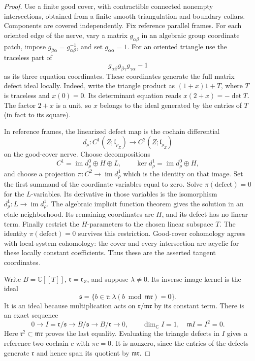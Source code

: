 \begin{proof}
Use a finite good cover, with contractible connected nonempty
intersections, obtained from a finite smooth triangulation and
boundary collars.  Components are covered independently.
Fix reference parallel frames.  For each oriented edge of the
nerve, vary a matrix \(g_{\alpha\beta}\) in an algebraic group
coordinate patch, impose
\(g_{\beta\alpha}=g_{\alpha\beta}^{-1}\), and set
\(g_{\alpha\alpha}=1\).  For an oriented triangle use the
traceless part of
\[
 g_{\alpha\beta}g_{\beta\gamma}g_{\gamma\alpha}-1
\]
as its three equation coordinates.  These coordinates generate
the full matrix defect ideal locally.  Indeed, write the triangle
product as \((1+x)1+T\), where \(T\) is traceless and \(x(0)=0\).
Its determinant equation reads
\(x(2+x)=-\det T\).  The factor \(2+x\) is a unit, so \(x\)
belongs to the ideal generated by the entries of \(T\)
(in fact to its square).

In reference frames, the linearized defect map is the cochain
differential
\[
 d_\rho:C^1(Z;\mathfrak l_{\rho_Z})
                    \longrightarrow C^2(Z;\mathfrak l_{\rho_Z})
\]
on the good-cover nerve.  Choose decompositions
\[
 C^1=\operatorname{im}d_\rho^0\oplus H\oplus L,\qquad
 \ker d_\rho^1=\operatorname{im}d_\rho^0\oplus H,
\]
and choose a projection
\(\pi:C^2\to\operatorname{im}d_\rho^1\) which is the identity on
that image.  Set the first summand of the coordinate variables
equal to zero.  Solve \(\pi(\text{defect})=0\) for the
\(L\)-variables.  Its derivative in those variables is the
isomorphism
\(d_\rho^1:L\to\operatorname{im}d_\rho^1\).
The algebraic implicit function theorem gives the solution in
an etale neighborhood.  Its remaining coordinates are \(H\),
and its defect has no linear term.  Finally restrict the
\(H\)-parameters to the chosen linear subspace \(T\).
The identity \(\pi(\text{defect})=0\) survives this restriction.
Good-cover cohomology agrees with local-system cohomology:
the cover and every intersection are acyclic for these locally
constant coefficients.  Thus these are the asserted tangent
coordinates.

Write \(B=\mathbb C[[T]]\), \(\mathfrak r=\mathfrak r_Z\), and
suppose \(\lambda\ne0\).  Its inverse-image kernel is the ideal
\[
 \mathfrak s
 =\{b\in\mathfrak r:\lambda(b\bmod\mathfrak m\mathfrak r)=0\}.
\]
It is an ideal because multiplication acts on
\(\mathfrak r/\mathfrak m\mathfrak r\) by its constant term.
There is an exact sequence
\begin{equation}
 0\longrightarrow I=\mathfrak r/\mathfrak s
 \longrightarrow B/\mathfrak s
 \longrightarrow B/\mathfrak r\longrightarrow0,
 \qquad
 \dim_{\mathbb C}I=1,\quad \mathfrak m I=I^2=0.
 \label{def:small-extension}
\end{equation}
Here \(\mathfrak r^2\subset\mathfrak m\mathfrak r\) proves the last
equality.  Evaluating the triangle defects in \(I\) gives a
reference two-cochain \(c\) with \(\pi c=0\).
It is nonzero, since the entries of the defects generate
\(\mathfrak r\) and hence span its quotient by
\(\mathfrak m\mathfrak r\).


\end{proof}
